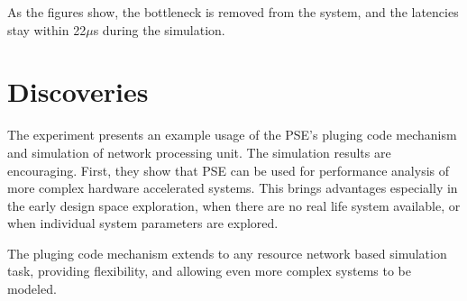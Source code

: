 As the figures show, the bottleneck is removed from the system, and the latencies stay within 22$\mu$s during the simulation.

\section{Discoveries}

The experiment presents an example usage of the PSE's pluging code mechanism and simulation of network processing unit. The simulation results are encouraging. First, they show that PSE can be used for performance analysis of more complex hardware accelerated systems. This brings advantages especially in the early design space exploration, when there are no real life system available, or when individual system parameters are explored.

The pluging code mechanism extends to any resource network based simulation task, providing flexibility, and allowing even more complex systems to be modeled.

